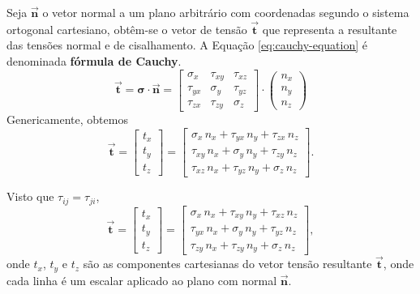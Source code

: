 \documentclass[11pt]{article}
\begin{document}
	Seja $\boldsymbol{\vec{n}}$ o vetor normal a um plano arbitrário com coordenadas segundo o sistema ortogonal cartesiano, obtêm-se o vetor de tensão $\boldsymbol{\vec{t}}$ que representa a resultante das tensões normal e de cisalhamento. A Equação \ref{eq:cauchy-equation} é denominada \textbf{fórmula de Cauchy}.
	\begin{equation}
		\boldsymbol{\vec{t}} = \mathbf{\sigma}\cdot \boldsymbol{\vec{n}} =
		\begin{bmatrix}
			\sigma_{x} & \tau_{xy} & \tau_{xz} \\
			\tau_{yx} & \sigma_{y} & \tau_{yz} \\
			\tau_{zx} & \tau_{zy} & \sigma_{z}
		\end{bmatrix}
		\cdot
		\begin{pmatrix}
			n_x \\
			n_y \\
			n_z
		\end{pmatrix}
		\label{eq:cauchy-equation}
	\end{equation}
	Genericamente, obtemos
	\[
	\boldsymbol{\vec{t}} =
	\begin{bmatrix}
		t_x \\
		t_y \\
		t_z
	\end{bmatrix}
	=
	\begin{bmatrix}
		\sigma_{x}\, n_x+\tau_{yx}\, n_y+\tau_{zx}\, n_z \\
		\tau_{xy}\, n_x+\sigma_{y}\, n_y+\tau_{zy}\, n_z \\
		\tau_{xz}\, n_x+\tau_{yz}\, n_y+\sigma_{z}\, n_z
	\end{bmatrix}.
	\]
	
	Visto que $\tau_{ij}=\tau_{ji}$,
	\[
	\boldsymbol{\vec{t}} =
	\begin{bmatrix}
		t_x \\
		t_y \\
		t_z
	\end{bmatrix}
	=
	\begin{bmatrix}
		\sigma_{x}\, n_x+\tau_{xy}\, n_y+\tau_{xz}\, n_z \\
		\tau_{yx}\, n_x+\sigma_{y}\, n_y+\tau_{yz}\, n_z \\
		\tau_{zy}\, n_x+\tau_{zy}\, n_y+\sigma_{z}\, n_z
	\end{bmatrix},
	\]
	onde $t_x$, $t_y$ e $t_z$ são as componentes cartesianas do vetor tensão resultante $\boldsymbol{\vec{t}}$, onde cada linha é um escalar aplicado ao plano com normal $\boldsymbol{\vec{n}}$.
	
\end{document}
